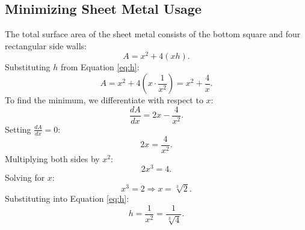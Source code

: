 \documentclass{article}
\begin{document}
\subsection{Minimizing Sheet Metal Usage}
The total surface area of the sheet metal consists of the bottom square and four rectangular side walls:
\begin{equation}
    A = x^2 + 4(xh).
    \label{eq:area}
\end{equation}
Substituting \( h \) from Equation \eqref{eq:h}:
\begin{equation}
    A = x^2 + 4 \left( x \cdot \frac{1}{x^2} \right) = x^2 + \frac{4}{x}.
    \label{eq:area2}
\end{equation}
To find the minimum, we differentiate with respect to \( x \):
\begin{equation}
    \frac{dA}{dx} = 2x - \frac{4}{x^2}.
    \label{eq:derivative}
\end{equation}
Setting \( \frac{dA}{dx} = 0 \):
\begin{equation}
    2x = \frac{4}{x^2}.
\end{equation}
Multiplying both sides by \( x^2 \):
\begin{equation}
    2x^3 = 4.
\end{equation}
Solving for \( x \):
\begin{equation}
    x^3 = 2 \Rightarrow x = \sqrt[3]{2}.
\end{equation}
Substituting into Equation \eqref{eq:h}:
\begin{equation}
    h = \frac{1}{x^2} = \frac{1}{\sqrt[3]{4}}.
\end{equation}
\end{document}

